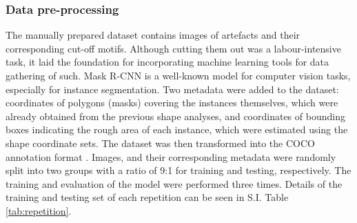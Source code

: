 \documentclass[11pt]{article}
\begin{document}
\subsubsection{Data pre-processing}
The manually prepared dataset contains images of artefacts and their corresponding cut-off motifs. Although cutting them out was a labour-intensive task, it laid the foundation for incorporating machine learning tools for data gathering of such. Mask R-CNN is a well-known model for computer vision tasks, especially for instance segmentation. Two metadata were added to the dataset: coordinates of polygons (masks) covering the instances themselves, which were already obtained from the previous shape analyses, and coordinates of bounding boxes indicating the rough area of each instance, which were estimated using the shape coordinate sets. The dataset was then transformed into the COCO annotation format \parencite{lin2014microsoft}. Images, and their corresponding metadata were randomly split into two groups with a ratio of 9:1 for training and testing, respectively. The training and evaluation of the model were performed three times. Details of the training and testing set of each repetition can be seen in S.I. Table \ref{tab:repetition}.\par
\end{document}
